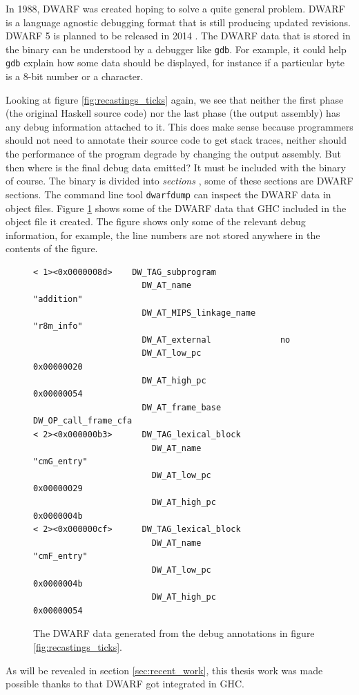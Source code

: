 In 1988, DWARF was created hoping to solve a quite general problem. DWARF is
a language agnostic debugging format that is still producing updated revisions.
DWARF 5 is planned to be released in 2014 \cite{eager2012introduction}. The DWARF data that is
stored in the binary can be understood by a debugger like \texttt{gdb}. For example,
it could help \texttt{gdb} explain how some data should be displayed, for instance if a
particular byte is a 8-bit number or a character.

Looking at figure \ref{fig:recastings_ticks} again, we see that neither
the first phase (the original Haskell source code) nor the last
phase (the output assembly) has any debug information attached to
it. This does make sense because programmers should not need to
annotate their source code to get stack traces, neither should the
performance of the program degrade by changing the output assembly.
But then where is the final debug data emitted? It must be included
with the binary of course. The binary is divided into \emph{sections}
\cite{oracle_object_file_format}, some of these sections are DWARF
sections. The command line tool \texttt{dwarfdump} can inspect the
DWARF data in object files. Figure \ref{fig:dwarfdump} shows some of the
DWARF data that GHC included in the object file it created. The figure
shows only some of the relevant debug information, for example, the line
numbers are not stored anywhere in the contents of the figure.

\begin{figure}
\begin{mdframed}
  \begin{verbatim}
< 1><0x0000008d>    DW_TAG_subprogram
                      DW_AT_name                  "addition"
                      DW_AT_MIPS_linkage_name     "r8m_info"
                      DW_AT_external              no
                      DW_AT_low_pc                0x00000020
                      DW_AT_high_pc               0x00000054
                      DW_AT_frame_base            DW_OP_call_frame_cfa
< 2><0x000000b3>      DW_TAG_lexical_block
                        DW_AT_name                  "cmG_entry"
                        DW_AT_low_pc                0x00000029
                        DW_AT_high_pc               0x0000004b
< 2><0x000000cf>      DW_TAG_lexical_block
                        DW_AT_name                  "cmF_entry"
                        DW_AT_low_pc                0x0000004b
                        DW_AT_high_pc               0x00000054
  \end{verbatim}
  \caption{The DWARF data generated from the debug annotations in figure
    \ref{fig:recastings_ticks}.}
  \label{fig:dwarfdump}
\end{mdframed}
\end{figure}

As will be revealed in
section \ref{sec:recent_work}, this thesis work was made possible thanks
to that DWARF got integrated in GHC.
